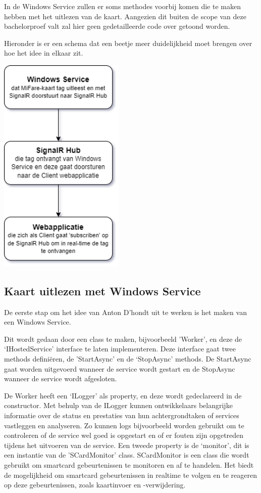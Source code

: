 In de Windows Service zullen er soms methodes voorbij komen die te maken hebben met het uitlezen van de kaart. Aangezien dit buiten de scope van deze bachelorproef valt zal hier geen gedetailleerde code over getoond worden. 

Hieronder is er een schema dat een beetje meer duidelijkheid moet brengen over hoe het idee in elkaar zit. 

\begin{center}
    \includegraphics[width=6cm]{BP_voorbeeld_schema}
\end{center}

\subsection{Kaart uitlezen met Windows Service}
De eerste stap om het idee van Anton D'hondt uit te werken is het maken van een Windows Service.  

Dit wordt gedaan door een class te maken, bijvoorbeeld 'Worker’, en deze de ‘IHostedService’ interface te laten implementeren. Deze interface gaat twee methods definiëren, de 'StartAsync’ en de ‘StopAsync’ methods. De StartAsync gaat worden uitgevoerd wanneer de service wordt gestart en de StopAsync wanneer de service wordt afgesloten.  

De Worker heeft een ‘ILogger’ als property, en deze wordt gedeclareerd in de constructor. Met behulp van de ILogger kunnen ontwikkelaars belangrijke informatie over de status en prestaties van hun achtergrondtaken of services vastleggen en analyseren. Zo kunnen logs bijvoorbeeld worden gebruikt om te controleren of de service wel goed is opgestart en of er fouten zijn opgetreden tijdens het uitvoeren van de service. Een tweede property is de ‘monitor’, dit is een instantie van de 'SCardMonitor' class.  SCardMonitor is een class die wordt gebruikt om smartcard gebeurtenissen te monitoren en af te handelen. Het biedt de mogelijkheid om smartcard gebeurtenissen in realtime te volgen en te reageren op deze gebeurtenissen, zoals kaartinvoer en -verwijdering.

